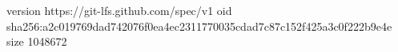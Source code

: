 version https://git-lfs.github.com/spec/v1
oid sha256:a2c019769dad742076f0ea4ec2311770035cdad7c87c152f425a3c0f222b9e4e
size 1048672
